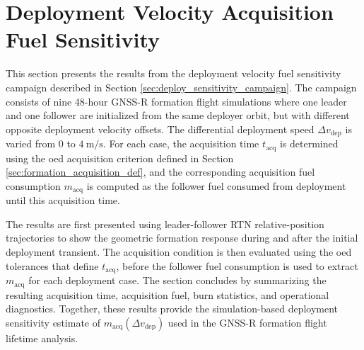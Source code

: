 
\clearpage
\section{Deployment Velocity Acquisition Fuel Sensitivity}
\label{sec:deployment_vel_acq_fuel_sens}
This section presents the results from the deployment velocity fuel sensitivity campaign described in Section \ref{sec:deploy_sensitivity_campaign}. The campaign consists of nine 48-hour GNSS-R formation flight simulations where one leader and one follower are initialized from the same deployer orbit, but with different opposite deployment velocity offsets. The differential deployment speed $\Delta v_{\mathrm{dep}}$ is varied from $0$ to $4~\mathrm{m/s}$. For each case, the acquisition time $t_{\mathrm{acq}}$ is determined using the \gls{oed} acquisition criterion defined in Section \ref{sec:formation_acquisition_def}, and the corresponding acquisition fuel consumption $m_{\mathrm{acq}}$ is computed as the follower fuel consumed from deployment until this acquisition time.

The results are first presented using leader-follower RTN relative-position trajectories to show the geometric formation response during and after the initial deployment transient. The acquisition condition is then evaluated using the \gls{oed} tolerances that define $t_{\mathrm{acq}}$, before the follower fuel consumption is used to extract $m_{\mathrm{acq}}$ for each deployment case. The section concludes by summarizing the resulting acquisition time, acquisition fuel, burn statistics, and operational diagnostics. Together, these results provide the simulation-based deployment sensitivity estimate of $m_{\mathrm{acq}}(\Delta v_{\mathrm{dep}})$ used in the GNSS-R formation flight lifetime analysis.


